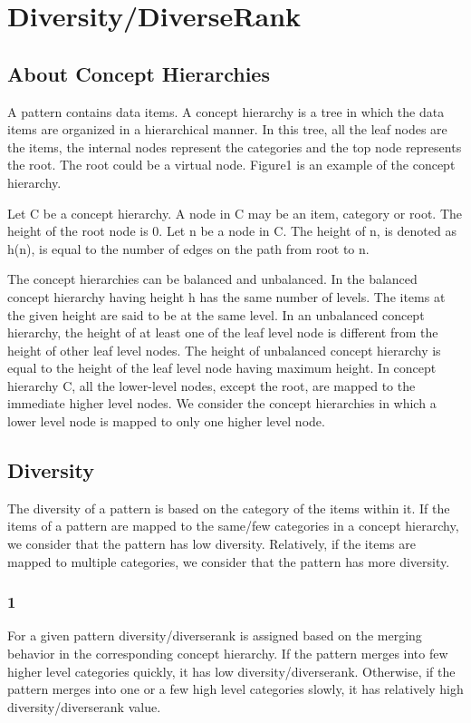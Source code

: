 \section{Diversity/DiverseRank}
\subsection{About Concept Hierarchies}
A pattern contains data items. A concept hierarchy is a tree in which the data items are organized in a hierarchical manner. In this tree, all the leaf nodes are the items, the internal nodes represent the categories and the top node represents the root. The root could be a virtual node. Figure1 \iffalse(figure number) \fi is an example of the concept hierarchy.

Let C be a concept hierarchy. A node in C may be an item, category or root. The height of the root node is 0. Let n be a node in C. The height of n, is denoted as h(n), is equal to the number of edges on the path from root to n.

The concept hierarchies can be balanced and unbalanced. In the balanced concept hierarchy having height h has the same number of levels. The items at the given height are said to be at the same level. In an unbalanced concept hierarchy, the height of at least one of the leaf level node is different from the height of other leaf level nodes. The height of unbalanced concept hierarchy is equal to the height of the leaf level node having maximum height. In concept hierarchy C, all the lower-level nodes, except the root, are mapped to the immediate higher level nodes. We consider the concept hierarchies in which a lower level node is mapped to only one higher level node.

\subsection{Diversity}
The diversity of a pattern is based on the category of the items within it. If the items of a pattern are mapped to the same/few categories in a concept hierarchy, we consider that the pattern has low diversity. Relatively, if the items are mapped to multiple categories, we consider that the pattern has more diversity. 

\subsubsection{1}
For a given pattern diversity/diverserank is assigned based on the merging behavior in the corresponding concept hierarchy. If the pattern merges into few higher level categories quickly, it has low diversity/diverserank. Otherwise, if the pattern merges into one or a few high level categories slowly, it has relatively high diversity/diverserank value.

